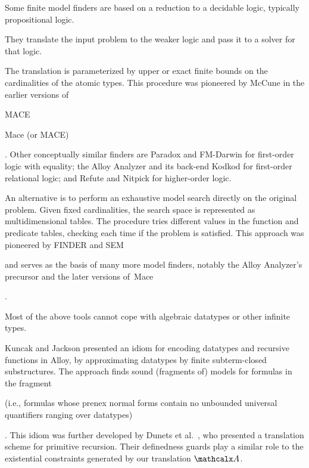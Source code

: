 Some finite model finders are based on a reduction to a decidable logic,
typically propositional logic. \begin{rep}They translate the input problem to the weaker
logic and pass it to a solver for that logic.\end{rep}
The translation is parameterized by upper or exact finite bounds on
the cardinalities of the atomic types. This procedure was pioneered by McCune
in the earlier versions of
\begin{conf}MACE\end{conf}\begin{rep}Mace (or MACE)\end{rep}
\cite{mccune-1994}.
Other conceptually similar finders are Paradox \cite{claessen-sorensson-2003}
and FM-Darwin \cite{baumgartner-et-al-2009} for first-order logic with
equality; the Alloy Analyzer and its back-end Kodkod \cite{torlak-jackson-2007}
for first-order relational logic; and Refute \cite{weber-2008} and Nitpick
\cite{blanchette-nipkow-2010} for higher-order logic.

An alternative is to perform
an exhaustive model search directly on the original problem. Given fixed
cardinalities, the search space is represented as multidimensional
tables. The procedure tries different values in the function and predicate
tables, checking each time if the problem is satisfied.
This approach was pioneered by FINDER
\cite{slaney-1994} and SEM \cite{zhang-zhang-1995}\begin{rep} and serves as
the basis of many more model finders, notably the Alloy Analyzer's precursor
\cite{jackson-1996} and the later versions of~Mace
\cite{mccune-prover9-mace4}\end{rep}.

\begin{rep}
Most of the above tools cannot cope with algebraic datatypes or other infinite
types. \end{rep}%
Kuncak and Jackson \cite{kuncak-jackson-2005} presented an idiom for
encoding datatypes and recursive functions in Alloy, by approximating datatypes
by finite subterm-closed substructures. The approach finds sound (fragments
of) models for formulas in the  fragment%
\begin{rep} (i.e., formulas whose prenex normal forms contain no unbounded universal
quantifiers ranging over datatypes)\end{rep}. This idiom was further developed by Dunets
et al.\ \cite{dunets-et-al-2010}, who presented a translation scheme
for primitive recursion. Their definedness guards play a similar role to the
existential constraints generated by our translation $\conv$.

